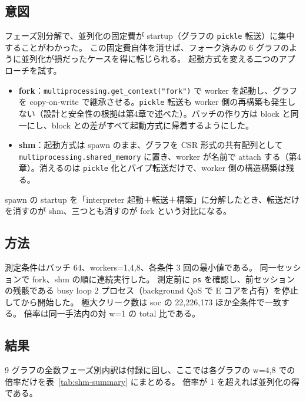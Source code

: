 \subsection{意図}

フェーズ別分解で、並列化の固定費が startup（グラフの \texttt{pickle} 転送）に集中することがわかった。
この固定費自体を消せば、フォーク済みの 6 グラフのように並列化が損だったケースを得に転じられる。
起動方式を変える二つのアプローチを試す。

\begin{itemize}
  \item \textbf{fork}：\texttt{multiprocessing.get\_context("fork")} で worker を起動し、グラフを copy-on-write で継承させる。\texttt{pickle} 転送も worker 側の再構築も発生しない（設計と安全性の根拠は第4章で述べた）。バッチの作り方は block と同一にし、block との差がすべて起動方式に帰着するようにした。
  \item \textbf{shm}：起動方式は spawn のまま、グラフを CSR 形式の共有配列として \texttt{multiprocessing.shared\_memory} に置き、worker が名前で attach する（第4章）。消えるのは \texttt{pickle} 化とパイプ転送だけで、worker 側の構造構築は残る。
\end{itemize}

spawn の startup を「interpreter 起動＋転送＋構築」に分解したとき、転送だけを消すのが shm、三つとも消すのが fork という対比になる。

\subsection{方法}

測定条件はバッチ 64、workers=1,4,8、各条件 3 回の最小値である。
同一セッションで fork、shm の順に連続実行した。
測定前に \texttt{ps} を確認し、前セッションの残骸である busy loop 2 プロセス（background QoS で E コアを占有）を停止してから開始した。
極大クリーク数は soc の 22{,}226{,}173 ほか全条件で一致する。
倍率は同一手法内の対 w=1 の total 比である。

\subsection{結果}

9 グラフの全数フェーズ別内訳は付録に回し、ここでは各グラフの w=4,8 での倍率だけを表~\ref{tab:shm-summary} にまとめる。
倍率が 1 を超えれば並列化の得である。


